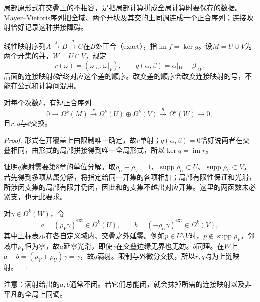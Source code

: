 局部原形式在交叠上的不相容，是把局部计算拼成全局计算时要保存的数据。Mayer--Vietoris序列把全域、两个开块及其交的上同调连成一个正合序列；连接映射恰好记录这种拼接障碍。
\begin{definition}[正合序列与本节符号]
线性映射序列$A\xrightarrow{f}B\xrightarrow{g}C$在$B$处正合（exact），指$\operatorname{im}f=\ker g$。设$M=U\cup V$为两个开集的并，$W=U\cap V$，规定
\[
 r(\omega)=(\omega|_U,\omega|_V),\qquad
 q(\alpha,\beta)=\alpha|_W-\beta|_W.
\]
后面的连接映射$\delta$始终对应这个差的顺序。改变差的顺序会改变连接映射的号，不能在公式和计算间混用。
\end{definition}

\begin{lemma}[形式复形的短正合序列]\label{lem:mv-short}
对每个次数$k$，有短正合序列
\[
 0\longrightarrow\Omega^k(M)\xrightarrow{r}
 \Omega^k(U)\oplus\Omega^k(V)\xrightarrow{q}\Omega^k(W)
 \longrightarrow0,
\]
且$r,q$与$\dd$交换。
\end{lemma}
\begin{proof}
形式在开覆盖上由限制唯一确定，故$r$单射；$q(\alpha,\beta)=0$恰好说两者在交叠相同，由形式的局部拼接得到唯一全局形式，所以$\ker q=\operatorname{im}r$。

证明$q$满射需要第8章的单位分解。取$\rho_U+\rho_V=1$，$\operatorname{supp}\rho_U\subset U$、$\operatorname{supp}\rho_V\subset V$。若先得到多项从属分解，将指定给同一开集的各项相加；局部有限性保证和光滑，所涉闭支集的局部有限并仍闭，因此和的支集不越出对应开集。这里的两函数未必紧支，也无此要求。

对$\gamma\in\Omega^k(W)$，令
\[
 a=(\rho_V\gamma)^{\mathrm{ext}}\in\Omega^k(U),\qquad
 b=(-\rho_U\gamma)^{\mathrm{ext}}\in\Omega^k(V),
\]
其中上标表示在各自定义域内、交叠之外延零。例如$p\in U\setminus V$时，$p\notin\operatorname{supp}\rho_V$，邻域中$\rho_V$恒为零，故$a$延零光滑，即使$\gamma$在交叠边缘无界也无妨。$b$同理。在$W$上$a-b=(\rho_V+\rho_U)\gamma=\gamma$，故$q$满射。限制与外微分交换，所以$r,q$均为上链映射。
\end{proof}
注意：满射给出的$a,b$通常不闭。若它们总能闭，就会抹掉所需的连接映射以及非平凡的全局上同调。


